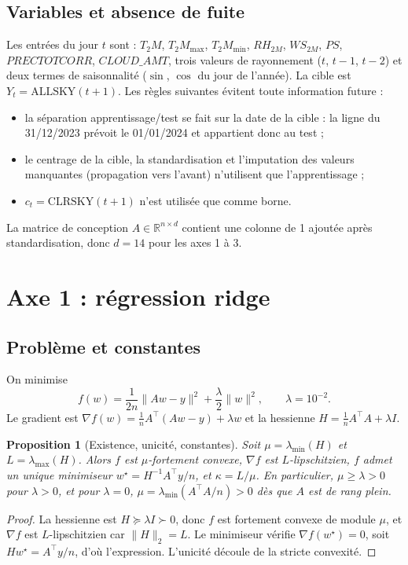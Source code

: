 \documentclass[11pt,a4paper]{article}
\newtheorem{proposition}[theorem]{Proposition}
\theoremstyle{remark}
\theoremstyle{definition}
\newcommand{\R}{\mathbb{R}}
\newcommand{\T}{^{\top}}
\begin{document}
\subsection{Variables et absence de fuite}
Les entrées du jour $t$ sont : $T_2M$, $T_2M_{\max}$, $T_2M_{\min}$, $RH_{2M}$, $WS_{2M}$, $PS$, $PRECTOTCORR$, $CLOUD\_AMT$,
trois valeurs de rayonnement ($t$, $t-1$, $t-2$) et deux termes de saisonnalité ($\sin$, $\cos$ du jour de l'année).
La cible est $Y_t = \mathrm{ALLSKY}(t+1)$. Les règles suivantes évitent toute information future :
\begin{itemize}[itemsep=2pt]
\item la séparation apprentissage/test se fait sur la date de la cible : la ligne du 31/12/2023 prévoit le 01/01/2024 et appartient donc au test ;
\item le centrage de la cible, la standardisation et l'imputation des valeurs manquantes (propagation vers l'avant) n'utilisent que l'apprentissage ;
\item $c_t = \mathrm{CLRSKY}(t+1)$ n'est utilisée que comme borne.
\end{itemize}
La matrice de conception $A \in \R^{n\times d}$ contient une colonne de 1 ajoutée après standardisation, donc $d = 14$ pour les axes 1 à 3.

\section{Axe 1 : régression ridge}\label{sec:ax1}
\subsection{Problème et constantes}
On minimise
\begin{equation}\label{eq:ridge}
f(w) = \frac{1}{2n}\|Aw - y\|^2 + \frac{\lambda}{2}\|w\|^2, \qquad \lambda = 10^{-2}.
\end{equation}
Le gradient est $\nabla f(w) = \frac1n A\T(Aw-y) + \lambda w$ et la hessienne $H = \frac1n A\T A + \lambda I$.

\begin{proposition}[Existence, unicité, constantes]\label{prop:ridge}
Soit $\mu = \lambda_{\min}(H)$ et $L = \lambda_{\max}(H)$. Alors $f$ est $\mu$-fortement convexe, $\nabla f$ est $L$-lipschitzien,
$f$ admet un unique minimiseur $w^\star = H^{-1} A\T y / n$, et $\kappa = L/\mu$.
En particulier, $\mu \ge \lambda > 0$ pour $\lambda > 0$, et pour $\lambda = 0$, $\mu = \lambda_{\min}(A\T A / n) > 0$ dès que $A$ est de rang plein.
\end{proposition}
\begin{proof}
La hessienne est $H \succeq \lambda I \succ 0$, donc $f$ est fortement convexe de module $\mu$, et $\nabla f$ est $L$-lipschitzien car $\|H\|_2 = L$.
Le minimiseur vérifie $\nabla f(w^\star) = 0$, soit $H w^\star = A\T y / n$, d'où l'expression. L'unicité découle de la stricte convexité.
\end{proof}
\end{document}
